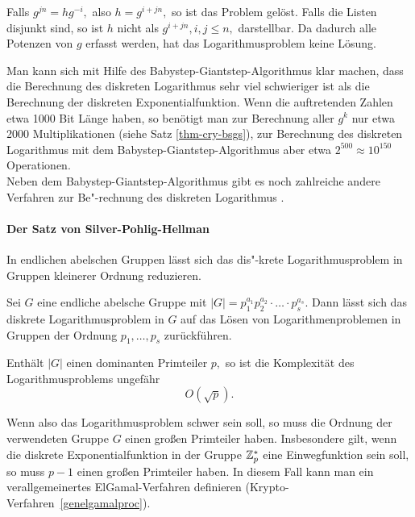 \begin{refsegment}
\begin{Beweis}{}
Falls $ g^{jn} = hg^{-i}, $ also $ h = g^{i+jn}, $ so ist das Problem gelöst. Falls
die Listen disjunkt sind, so ist $ h $ nicht als $ g^{i + jn}, i, j\leq n,$ darstellbar.
Da dadurch alle Potenzen von $ g $ erfasst werden, hat das Logarithmusproblem keine Lösung.
\end{Beweis}

Man kann sich mit Hilfe des Babystep-Giantstep-Algorithmus klar machen, dass die Berechnung des diskreten Logarithmus sehr viel schwieriger ist als die Berechnung der diskreten Exponentialfunktion. Wenn die auftretenden Zahlen etwa 1000 Bit Länge haben, so benötigt man zur Berechnung aller $ g^k $ nur etwa 2000 Multiplikationen (siehe Satz \ref{thm-cry-bsgs}), zur Berechnung des diskreten Logarithmus mit dem Babystep-Giantstep-Algorithmus aber etwa $ 2^{500} \approx 10^{150} $ Operationen.\\
Neben dem Babystep-Giantstep-Algorithmus gibt es noch zahlreiche andere Verfahren zur Be"-rechnung des diskreten Logarithmus \cite{Stin2006}.

\paragraph*{Der Satz von Silver-Pohlig-Hellman}
In endlichen abelschen Gruppen lässt sich das  dis"-krete Logarithmusproblem in Gruppen kleinerer Ordnung reduzieren.

\begin{satz}\label{thm-cry-pohe}
Sei $ G $ eine endliche abelsche Gruppe mit $ |G|= p_1^{a_1} p_2^{a_2} \cdot \ldots \cdot p_s^{a_s}. $ Dann lässt sich das diskrete Logarithmusproblem in $ G $ auf das Lösen von Logarithmenproblemen in Gruppen der Ordnung $ p_1, \ldots , p_s $ zurückführen.
\end{satz}

Enthält $ |G| $ einen \glqq dominanten\grqq {} Primteiler $ p ,$ so ist die Komplexität  des Logarithmusproblems ungefähr
\[ O(\sqrt{p}). \]

Wenn also das Logarithmusproblem schwer sein soll, so muss die Ordnung der verwendeten Gruppe $ G $ einen großen Primteiler haben. Insbesondere gilt, wenn die diskrete Exponentialfunktion in der Gruppe $ \mathbb{Z}_p^{\ast} $ eine Einwegfunktion sein soll, so muss $ p -1 $ einen großen Primteiler haben. In diesem Fall kann man ein verallgemeinertes ElGamal-Verfahren definieren (Krypto-Verfahren~\ref{genelgamalproc}).


\end{refsegment}

